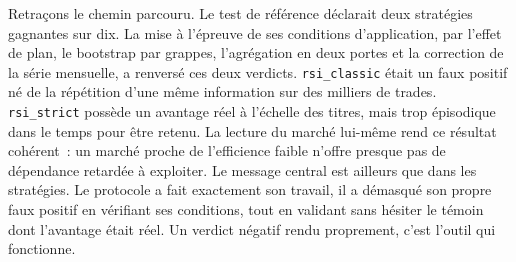 Retraçons le chemin parcouru. Le test de référence déclarait deux
stratégies gagnantes sur dix. La mise à l'épreuve de ses conditions
d'application, par l'effet de plan, le bootstrap par grappes,
l'agrégation en deux portes et la correction de la série mensuelle, a
renversé ces deux verdicts. \texttt{rsi\_classic} était un faux positif
né de la répétition d'une même information sur des milliers de trades.
\texttt{rsi\_strict} possède un avantage réel à l'échelle des titres,
mais trop épisodique dans le temps pour être retenu. La lecture du
marché lui-même rend ce résultat cohérent~: un marché proche de
l'efficience faible n'offre presque pas de dépendance retardée à
exploiter. Le message central est ailleurs que dans les stratégies. Le
protocole a fait exactement son travail, il a démasqué son propre faux
positif en vérifiant ses conditions, tout en validant sans hésiter le
témoin dont l'avantage était réel. Un verdict négatif rendu proprement,
c'est l'outil qui fonctionne.
